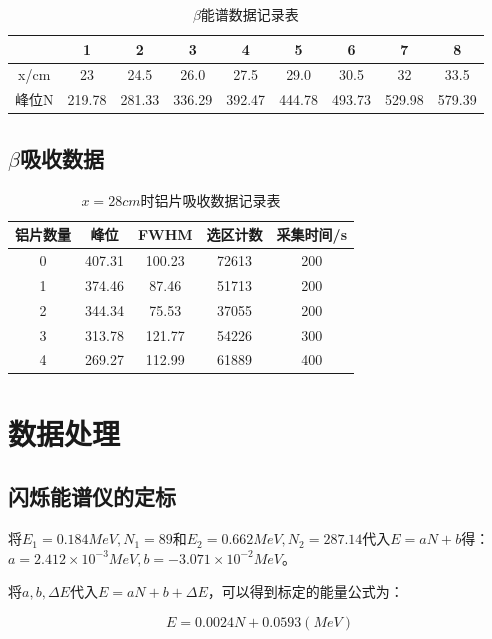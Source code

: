 \documentclass[a4paper,UTF8]{ctexart}
\begin{document}
\begin{table}[H]
    \centering
    \begin{tabular}{|c|c|c|c|c|c|c|c|c|}
    \hline
        ~ & 1 & 2 & 3 & 4 & 5 & 6 & 7 & 8 \\ \hline
        x/cm & 23 & 24.5 & 26.0 & 27.5 & 29.0 & 30.5 & 32 & 33.5 \\ \hline
        峰位N & 219.78 & 281.33 & 336.29 & 392.47 & 444.78 & 493.73 & 529.98 & 579.39 \\ \hline
    \end{tabular}
    \caption{$\beta$能谱数据记录表}
\end{table}

\subsection{$\beta$吸收数据}

\begin{table}[H]
    \centering
    \begin{tabular}{|c|c|c|c|c|}
    \hline
        铝片数量 & 峰位 & FWHM & 选区计数 & 采集时间/s \\ \hline
        0 & 407.31 & 100.23 & 72613 & 200 \\ \hline
        1 & 374.46 & 87.46 & 51713 & 200 \\ \hline
        2 & 344.34 & 75.53 & 37055 & 200 \\ \hline
        3 & 313.78 & 121.77 & 54226 & 300 \\ \hline
        4 & 269.27 & 112.99 & 61889 & 400 \\ \hline
    \end{tabular}
    \caption{$x=28cm$时铝片吸收数据记录表}
\end{table}

\section{数据处理}

\subsection{闪烁能谱仪的定标}

将$E_1 = 0.184 MeV,N_1 = 89$和$E_2 = 0.662MeV,N_2 = 287.14$代入$E= aN +b$得：
$a = 2.412 \times 10^{-3} MeV,b = -3.071 \times 10^{-2} MeV$。

将$a,b,\Delta E$代入$E = aN+b + \Delta E$，可以得到标定的能量公式为：

\begin{equation}
    E = 0.0024 N + 0.0593 (MeV)
\end{equation}
\end{document}
